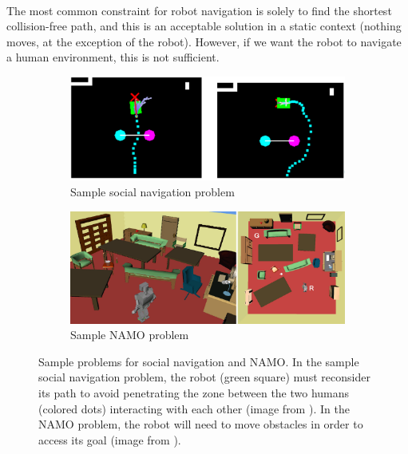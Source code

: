 \paragraph{} The most common constraint for robot navigation is solely to find the shortest collision-free path, and this is an acceptable solution in a static context (nothing moves, at the exception of the robot). However, if we want the robot to navigate a human environment, this is not sufficient.

\begin{figure}[H]
\centering
\begin{subfigure}{.48\textwidth}
  \centering
  \includegraphics[width=\linewidth]{Figures/Problem_Illustration/social_problem.png}
  \caption{Sample social navigation problem}
  \label{fig:social_problem}
\end{subfigure}\hspace*{\fill}
\begin{subfigure}{.48\textwidth}
  \centering
  \includegraphics[width=0.9\linewidth]{Figures/Problem_Illustration/namo_problem.png}
  \caption{Sample NAMO problem}
  \label{fig:namo_problem}
\end{subfigure}
\caption{Sample problems for social navigation and NAMO. In the sample social navigation problem, the robot (green square) must reconsider its path to avoid penetrating the zone between the two humans (colored dots) interacting with each other (image from \parencite{rios-martinez_understanding_2011}). In the NAMO problem,  the robot will need to move obstacles in order to access its goal (image from \parencite{stilman_navigation_2005}).}
\label{fig:navigation_problems}
\end{figure}

